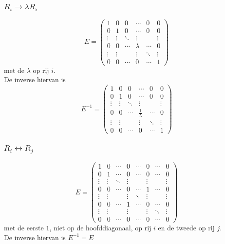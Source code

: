 \documentclass[lineaire_algebra_oplossingen.tex]{subfiles}
\begin{document}
\subsubsection*{$R_i\rightarrow \lambda R_i$}
\[
E=
\begin{pmatrix}
1 & 0 & 0 & \cdots & 0 & 0\\
0 & 1 & 0 & \cdots & 0 & 0\\
\vdots & \vdots & \ddots & \vdots& & \vdots\\
0 & 0 & \cdots & \lambda & \cdots & 0\\
\vdots & \vdots & & \vdots& \ddots & \vdots\\
0 & 0 & \cdots & 0 & \cdots &1
\end{pmatrix}
\]
met de $\lambda$ op rij $i$.\\
De inverse hiervan is
\[
E^{-1}=
\begin{pmatrix}
1 & 0 & 0 & \cdots & 0 & 0\\
0 & 1 & 0 & \cdots & 0 & 0\\
\vdots & \vdots & \ddots & \vdots& & \vdots\\
0 & 0 & \cdots & \frac{1}{\lambda} & \cdots & 0\\
\vdots & \vdots & & \vdots& \ddots & \vdots\\
0 & 0 & \cdots & 0 & \cdots &1
\end{pmatrix}
\]

\subsubsection*{$R_i \leftrightarrow R_j$}
\[
E=
\begin{pmatrix}
1 & 0 & \cdots & 0 & \cdots & 0 & \cdots & 0\\
0 & 1 & \cdots & 0 & \cdots & 0 & \cdots & 0\\
\vdots & \vdots & \ddots & \vdots& & \vdots & &\vdots\\
0 & 0 & \cdots & 0 & \cdots & 1 & \cdots & 0\\
\vdots & \vdots & & \vdots& \ddots & \vdots & &\vdots\\
0 & 0 & \cdots & 1 & \cdots & 0 & \cdots & 0\\
\vdots & \vdots & & \vdots & & \vdots & \ddots & \vdots\\
0 & 0 & \cdots & 0 & \cdots & 0 & \cdots & 0
\end{pmatrix}
\]
met de eerste $1$, niet op de hoofddiagonaal, op rij $i$ en de tweede op rij $j$.\\
De inverse hiervan is $E^{-1} = E$
\end{document}
